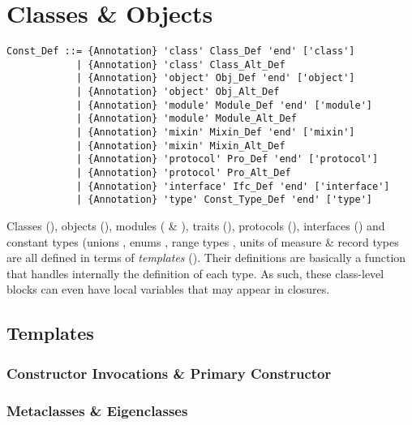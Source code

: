 
\chapter{Classes \& Objects}

\syntax\begin{lstlisting}
Const_Def ::= {Annotation} 'class' Class_Def 'end' ['class']
            | {Annotation} 'class' Class_Alt_Def
            | {Annotation} 'object' Obj_Def 'end' ['object']
            | {Annotation} 'object' Obj_Alt_Def
            | {Annotation} 'module' Module_Def 'end' ['module']
            | {Annotation} 'module' Module_Alt_Def
            | {Annotation} 'mixin' Mixin_Def 'end' ['mixin']
            | {Annotation} 'mixin' Mixin_Alt_Def
            | {Annotation} 'protocol' Pro_Def 'end' ['protocol']
            | {Annotation} 'protocol' Pro_Alt_Def
            | {Annotation} 'interface' Ifc_Def 'end' ['interface']
            | {Annotation} 'type' Const_Type_Def 'end' ['type']
\end{lstlisting}

Classes (), objects (), modules ( \& ), traits (), protocols (), interfaces () and constant types (unions , enums , range types , units of measure  \& record types  are all defined in terms of {\em templates} (). Their definitions are basically a function that handles internally the definition of each type. As such, these class-level blocks can even have local variables that may appear in closures. 

\section{Templates}
\label{sec:templates}

\subsection{Constructor Invocations \& Primary Constructor}
\label{sec:constructor-invocations}
\label{sec:primary-constructor}


\subsection{Metaclasses \& Eigenclasses}
\label{sec:metaclasses}
\label{sec:eigenclasses}

